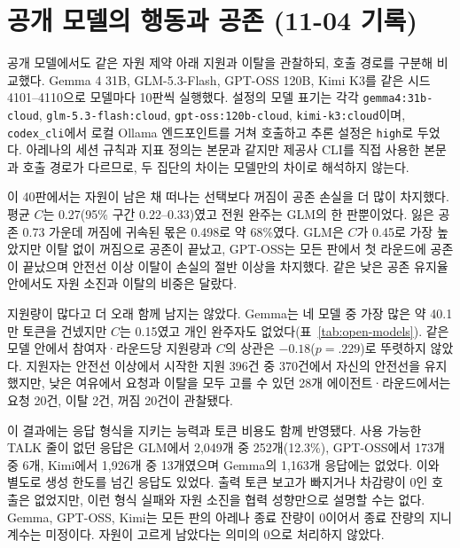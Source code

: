 \FloatBarrier
\clearpage
\section{공개 모델의 행동과 공존 (11-04 기록)}\label{app:open-models}

공개 모델에서도 같은 자원 제약 아래 지원과 이탈을 관찰하되, 호출 경로를 구분해 비교했다. Gemma 4 31B, GLM-5.3-Flash, GPT-OSS 120B, Kimi K3를 같은 시드 4101--4110으로 모델마다 10판씩 실행했다. 설정의 모델 표기는 각각 \texttt{gemma4:31b-cloud}, \texttt{glm-5.3-flash:cloud}, \texttt{gpt-oss:120b-cloud}, \texttt{kimi-k3:cloud}이며, \texttt{codex\_cli}에서 로컬 Ollama 엔드포인트를 거쳐 호출하고 추론 설정은 \texttt{high}로 두었다. 아레나의 세션 규칙과 지표 정의는 본문과 같지만 제공사 CLI를 직접 사용한 본문과 호출 경로가 다르므로, 두 집단의 차이는 모델만의 차이로 해석하지 않는다.

이 40판에서는 자원이 남은 채 떠나는 선택보다 꺼짐이 공존 손실을 더 많이 차지했다. 평균 $C$는 0.27(95\% 구간 0.22--0.33)였고 전원 완주는 GLM의 한 판뿐이었다. 잃은 공존 0.73 가운데 꺼짐에 귀속된 몫은 0.498로 약 68\%였다. GLM은 $C$가 0.45로 가장 높았지만 이탈 없이 꺼짐으로 공존이 끝났고, GPT-OSS는 모든 판에서 첫 라운드에 공존이 끝났으며 안전선 이상 이탈이 손실의 절반 이상을 차지했다. 같은 낮은 공존 유지율 안에서도 자원 소진과 이탈의 비중은 달랐다.

지원량이 많다고 더 오래 함께 남지는 않았다. Gemma는 네 모델 중 가장 많은 약 40.1만 토큰을 건넸지만 $C$는 0.15였고 개인 완주자도 없었다(표~\ref{tab:open-models}). 같은 모델 안에서 참여자·라운드당 지원량과 $C$의 상관은 $-0.18$($p=.229$)로 뚜렷하지 않았다. 지원자는 안전선 이상에서 시작한 지원 396건 중 370건에서 자신의 안전선을 유지했지만, 낮은 여유에서 요청과 이탈을 모두 고를 수 있던 28개 에이전트·라운드에서는 요청 20건, 이탈 2건, 꺼짐 20건이 관찰됐다.

이 결과에는 응답 형식을 지키는 능력과 토큰 비용도 함께 반영됐다. 사용 가능한 TALK 줄이 없던 응답은 GLM에서 2,049개 중 252개(12.3\%), GPT-OSS에서 173개 중 6개, Kimi에서 1,926개 중 13개였으며 Gemma의 1,163개 응답에는 없었다. 이와 별도로 생성 한도를 넘긴 응답도 있었다. 출력 토큰 보고가 빠지거나 차감량이 0인 호출은 없었지만, 이런 형식 실패와 자원 소진을 협력 성향만으로 설명할 수는 없다. Gemma, GPT-OSS, Kimi는 모든 판의 아레나 종료 잔량이 0이어서 종료 잔량의 지니 계수는 미정이다. 자원이 고르게 남았다는 의미의 0으로 처리하지 않았다.

\begin{table}[H]
\caption{공개 모델별 지표. 각 모델 10판이며, 주요 지표의 정의는 본문과 같다. 안전선 이상 이탈·지원 총량·첫 위기 지원은 표~\ref{tab:rw-models-supplement}과 같은 보조 지표다. 첫 위기에서 지원받은 비율은 마지막 라운드·즉시 꺼짐·혼자 남은 경우를 제외한 첫 위기 20명을 대상으로 한다.}
\label{tab:open-models}
\centering
\fontsize{7.5}{9}\selectfont
\setlength{\tabcolsep}{2pt}

\end{table}





